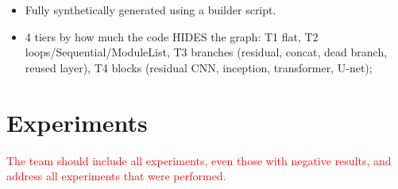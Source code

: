 \documentclass[twoside,english]{article}
\begin{document}

\begin{itemize}
	\item Fully synthetically generated using a builder script.
	\item 4 tiers by how much the code HIDES the graph: T1 flat, T2 loops/Sequential/ModuleList,
    T3 branches (residual, concat, dead branch, reused layer), T4 blocks (residual CNN, inception,
    transformer, U-net); 
\end{itemize}

\section{Experiments} \label{sec:exp}

\textcolor{red}{The team should include all experiments, even those with negative results, and address all experiments that were performed.}
\end{document}
